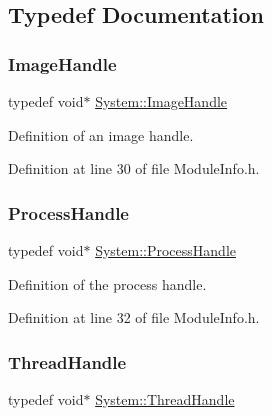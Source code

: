 \subsection{Typedef Documentation}
\mbox{\label{namespaceSystem_a21dca3f6170a2b0a0ea3028040ba21b3}} 
\subsubsection{\texorpdfstring{Image\+Handle}{ImageHandle}}
{\footnotesize\ttfamily typedef void$\ast$ \hyperlink{namespaceSystem_a21dca3f6170a2b0a0ea3028040ba21b3}{System\+::\+Image\+Handle}}



Definition of an image handle. 



Definition at line 30 of file Module\+Info.\+h.

\mbox{\label{namespaceSystem_a7490ee4911e28ad26aa0fcdd00a629df}} 
\subsubsection{\texorpdfstring{Process\+Handle}{ProcessHandle}}
{\footnotesize\ttfamily typedef void$\ast$ \hyperlink{namespaceSystem_a7490ee4911e28ad26aa0fcdd00a629df}{System\+::\+Process\+Handle}}



Definition of the process handle. 



Definition at line 32 of file Module\+Info.\+h.

\mbox{\label{namespaceSystem_ad0b1bc3494d9fecebf85204f61224ac6}} 
\subsubsection{\texorpdfstring{Thread\+Handle}{ThreadHandle}}
{\footnotesize\ttfamily typedef void$\ast$ \hyperlink{namespaceSystem_ad0b1bc3494d9fecebf85204f61224ac6}{System\+::\+Thread\+Handle}}



